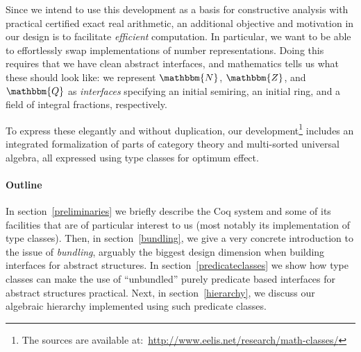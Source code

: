 \documentclass[a4paper,10pt,runningheads]{llncs}
\newcommand{\N}{\ensuremath{\mathbbm{N}}}
\newcommand{\Z}{\ensuremath{\mathbbm{Z}}}
\newcommand{\Q}{\ensuremath{\mathbbm{Q}}}
\begin{document}
Since we intend to use this development as a basis for constructive analysis with practical certified exact real arithmetic, an additional objective and motivation in our design is to facilitate \emph{efficient} computation. In particular, we want to be able to effortlessly swap implementations of number representations. Doing this requires that we have clean abstract interfaces, and mathematics tells us what these should look like: we represent $\N$, $\Z$, and $\Q$ as \emph{interfaces} specifying an initial semiring, an initial ring, and a field of integral fractions, respectively.

To express these elegantly and without duplication, our development\footnote{The sources are available
at:~\url{http://www.eelis.net/research/math-classes/}} includes an integrated formalization of parts of category theory and multi-sorted universal algebra, all expressed using type classes for optimum effect.


\paragraph{Outline}
In section~\ref{preliminaries} we briefly describe the Coq system and some of its facilities that are of particular interest to us (most notably its implementation of type classes). Then, in section~\ref{bundling}, we give a very concrete introduction to the issue of \emph{bundling}, arguably the biggest design dimension when building interfaces for abstract structures. In section~\ref{predicateclasses} we show how type classes can make the use of ``unbundled'' purely predicate based interfaces for abstract structures practical. Next, in section~\ref{hierarchy}, we discuss our algebraic hierarchy implemented using such predicate classes.


\end{document}
